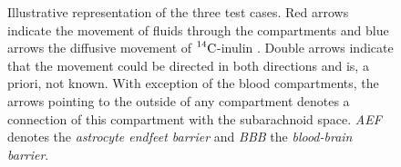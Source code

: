 \documentclass[a4paper,11pt]{article} %
\newcommand{\1}{^{(1)}}
\newcommand{\2}{^{(2)}}
\newcommand{\Cinulin}{$\prescript{14}{}{\text{C}}$-inulin }
\providecommand{\DIFdelbegin}{} %
\newcommand{\DIFscaledelfig}{0.5}
\newlength{\DIFdelgraphicswidth} %
\newlength{\DIFdelgraphicsheight} %
\newcommand{\DIFdelincludegraphics}[2][]{%
\sbox{\DIFdelgraphicsbox}{\DIFOincludegraphics[#1]{#2}}%
\settoboxwidth{\DIFdelgraphicswidth}{\DIFdelgraphicsbox} %
\settoboxtotalheight{\DIFdelgraphicsheight}{\DIFdelgraphicsbox} %
\scalebox{\DIFscaledelfig}{%
\parbox[b]{\DIFdelgraphicswidth}{\usebox{\DIFdelgraphicsbox}\\[-\baselineskip] \rule{\DIFdelgraphicswidth}{0em}}\llap{\resizebox{\DIFdelgraphicswidth}{\DIFdelgraphicsheight}{%
\setlength{\unitlength}{\DIFdelgraphicswidth}%
\begin{picture}(1,1)%
\thicklines\linethickness{2pt} %
{\color[rgb]{1,0,0}\put(0,0){\framebox(1,1){}}}%
{\color[rgb]{1,0,0}\put(0,0){\line( 1,1){1}}}%
{\color[rgb]{1,0,0}\put(0,1){\line(1,-1){1}}}%
\end{picture}%
}\hspace*{3pt}}} %
} %
\DeclareRobustCommand{\DIFdelbegin}{\DIFOdelbegin \let\includegraphics\DIFdelincludegraphics} %
\begin{document}


\begin{figure}
\centering
  \caption{Illustrative representation of the three test cases. Red arrows indicate the movement of fluids through the compartments and blue arrows the diffusive movement of \Cinulin. Double arrows indicate that the movement could be directed in both directions and is, a priori, not known. With exception of the blood compartments, the arrows pointing to the outside of any compartment denotes a connection of this compartment with the subarachnoid space. \textit{AEF} denotes the \textit{astrocyte endfeet barrier} and \textit{BBB} the \textit{blood-brain barrier}.  }
\label{fig:multi-comp}
\end{figure}


\DIFdelbegin %
\end{document}
